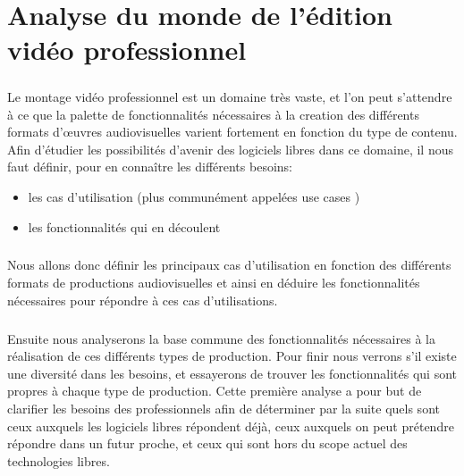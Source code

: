 \setcounter{page}{1}
\chapter {Analyse du monde de l'édition vidéo professionnel}

\minitoc \mtcskip \newpage


\paragraph{}



Le montage vidéo professionnel est un domaine très vaste, et l'on
peut s'attendre à ce que la palette de fonctionnalités nécessaires
à la creation des différents formats d'œuvres audiovisuelles
varient fortement en fonction du type de contenu. Afin d'étudier les
possibilités d'avenir des logiciels libres dans ce domaine, il nous
faut définir, pour en connaître les différents besoins:

\begin{itemize} \setlength{\itemsep}{2mm}

  \item {les cas d'utilisation (plus communément appelées use cases
    )} 

  \item {les fonctionnalités qui en découlent}

\end{itemize}


\paragraph{}

Nous allons donc définir les principaux cas d'utilisation en fonction des
différents formats de productions audiovisuelles et ainsi en déduire les
fonctionnalités nécessaires pour répondre à ces cas d'utilisations.

\paragraph{}

Ensuite nous analyserons la base commune des fonctionnalités nécessaires
à la réalisation de ces différents types de production.  Pour finir
nous verrons s'il existe une diversité dans les besoins, et essayerons
de trouver les fonctionnalités qui sont propres à chaque type de
production. Cette première analyse a pour but de clarifier les besoins
des professionnels afin de déterminer par la suite quels sont ceux
auxquels les logiciels libres répondent déjà, ceux auxquels on peut
prétendre répondre dans un futur proche, et ceux qui sont hors du
scope actuel des technologies libres.

